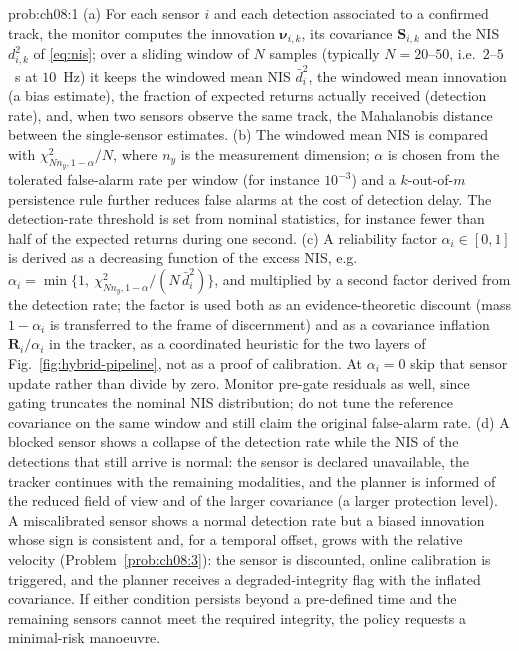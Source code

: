 \begin{sol}{prob:ch08:1}
(a) For each sensor $i$ and each detection associated to a confirmed track, the monitor computes the innovation $\boldsymbol{\nu}_{i,k}$, its covariance $\mathbf{S}_{i,k}$ and the NIS $d^2_{i,k}$ of \eqref{eq:nis}; over a sliding window of $N$ samples (typically $N=20$--$50$, i.e.\ $2$--$5$~s at $10$~Hz) it keeps the windowed mean NIS $\bar d^2_i$, the windowed mean innovation (a bias estimate), the fraction of expected returns actually received (detection rate), and, when two sensors observe the same track, the Mahalanobis distance between the single-sensor estimates. (b) The windowed mean NIS is compared with $\chi^2_{Nn_y,1-\alpha}/N$, where $n_y$ is the measurement dimension; $\alpha$ is chosen from the tolerated false-alarm rate per window (for instance $10^{-3}$) and a $k$-out-of-$m$ persistence rule further reduces false alarms at the cost of detection delay. The detection-rate threshold is set from nominal statistics, for instance fewer than half of the expected returns during one second. (c) A reliability factor $\alpha_i\in[0,1]$ is derived as a decreasing function of the excess NIS, e.g.\ $\alpha_i=\min\{1,\ \chi^2_{Nn_y,1-\alpha}/(N\,\bar d^2_i)\}$, and multiplied by a second factor derived from the detection rate; the factor is used both as an evidence-theoretic discount (mass $1-\alpha_i$ is transferred to the frame of discernment) and as a covariance inflation $\mathbf{R}_i/\alpha_i$ in the tracker, as a coordinated heuristic for the two layers of Fig.~\ref{fig:hybrid-pipeline}, not as a proof of calibration. At $\alpha_i=0$ skip that sensor update rather than divide by zero. Monitor pre-gate residuals as well, since gating truncates the nominal NIS distribution; do not tune the reference covariance on the same window and still claim the original false-alarm rate. (d) A blocked sensor shows a collapse of the detection rate while the NIS of the detections that still arrive is normal: the sensor is declared unavailable, the tracker continues with the remaining modalities, and the planner is informed of the reduced field of view and of the larger covariance (a larger protection level). A miscalibrated sensor shows a normal detection rate but a biased innovation whose sign is consistent and, for a temporal offset, grows with the relative velocity (Problem~\ref{prob:ch08:3}): the sensor is discounted, online calibration is triggered, and the planner receives a degraded-integrity flag with the inflated covariance. If either condition persists beyond a pre-defined time and the remaining sensors cannot meet the required integrity, the policy requests a minimal-risk manoeuvre.
\end{sol}

